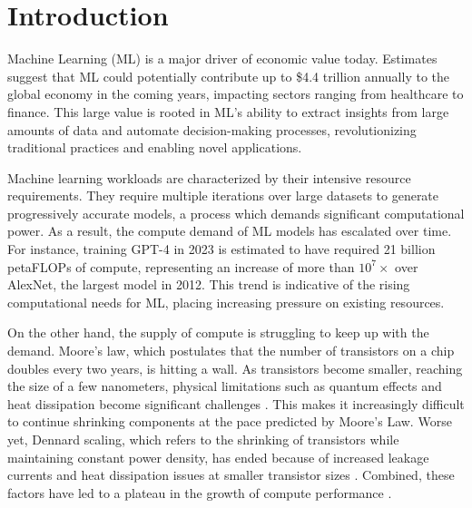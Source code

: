 \chapter{Introduction}
\label{ch_intro}

\newcommand{\fillme}{\textcolor{red}{FILL ME}}

Machine Learning (ML) is a major driver of economic value today.  Estimates suggest that ML could potentially contribute up to \$4.4 trillion annually \cite{mckinseygenai} to the global economy in the coming years, impacting sectors ranging from healthcare to finance. This large value is rooted in ML's ability to extract insights from large amounts of data and automate decision-making processes, revolutionizing traditional practices and enabling novel applications.

Machine learning workloads are characterized by their intensive resource requirements. They require multiple iterations over large datasets to generate progressively accurate models, a process which demands significant computational power. 
As a result, the compute demand of ML models has escalated over time.  For instance, training GPT-4\cite{openai2023gpt4} in 2023 is estimated to have required 21 billion petaFLOPs\cite{mlmodelflops} of compute, representing an increase of more than $10^{7}\times$ over AlexNet, the largest model in 2012. This trend is indicative of the rising computational needs for ML, placing increasing pressure on existing resources.


On the other hand, the supply of compute is struggling to keep up with the demand. Moore's law, which postulates that the number of transistors on a chip doubles every two years, is hitting a wall. As transistors become smaller, reaching the size of a few nanometers, physical limitations such as quantum effects and heat dissipation become significant challenges \cite{mooreslawend}. This makes it increasingly difficult to continue shrinking components at the pace predicted by Moore's Law. Worse yet, Dennard scaling, which refers to the shrinking of transistors while maintaining constant power density, has ended because of increased leakage currents and heat dissipation issues at smaller transistor sizes \cite{dennardscalingend}. Combined, these factors have led to a plateau in the growth of compute performance \cite{cpudb}.

